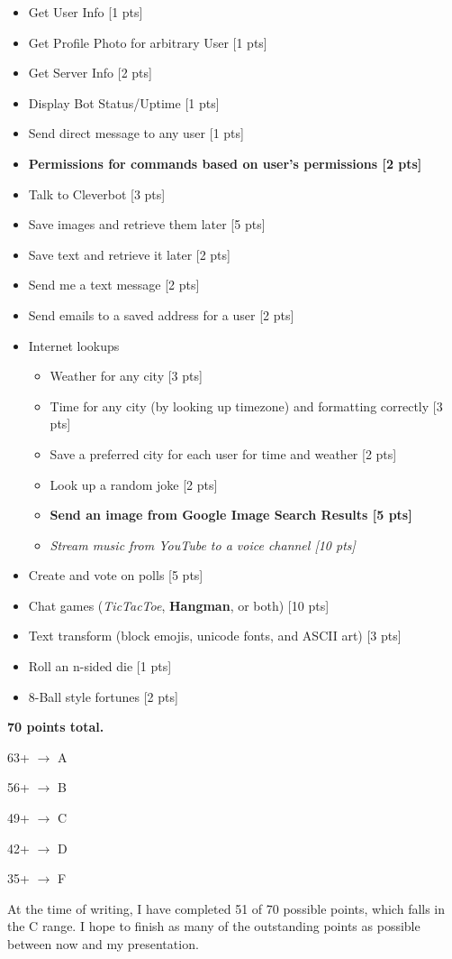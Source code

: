 \documentclass[12pt]{article} %
\begin{document}
\begin{itemize}

    \item Get User Info [1 pts]
    \item Get Profile Photo for arbitrary User [1 pts]
    \item Get Server Info [2 pts]
    \item Display Bot Status/Uptime [1 pts]
    \item Send direct message to any user [1 pts]
    \item \textbf{Permissions for commands based on user's permissions [2 pts]}
    \item Talk to Cleverbot [3 pts]
    \item Save images and retrieve them later [5 pts]
    \item Save text and retrieve it later [2 pts]
    \item Send me a text message [2 pts]
    \item Send emails to a saved address for a user [2 pts]
    \item Internet lookups
        \begin{itemize}
            \item Weather for any city [3 pts]
            \item Time for any city (by looking up timezone) and formatting correctly [3 pts]
            \item Save a preferred city for each user for time and weather [2 pts]
            \item Look up a random joke [2 pts]
            \item \textbf{Send an image from Google Image Search Results [5 pts]}
            \item \textit{Stream music from YouTube to a voice channel [10 pts]}
        \end{itemize}
    \item Create and vote on polls [5 pts]
    \item Chat games (\textit{TicTacToe}, \textbf{Hangman}, or both) [10 pts]
    \item Text transform (block emojis, unicode fonts, and ASCII art) [3 pts]
    \item Roll an n-sided die [1 pts]
    \item 8-Ball style fortunes [2 pts]

\end{itemize}


\textbf{70 points total.}

63+ $\rightarrow$ A

56+ $\rightarrow$ B

49+ $\rightarrow$ C

42+ $\rightarrow$ D

35+ $\rightarrow$ F

At the time of writing, I have completed 51 of 70 possible points, which falls in the C range. I hope to finish as many of the outstanding points as possible between now and my presentation.


\lstlistoflistings
\end{document}
